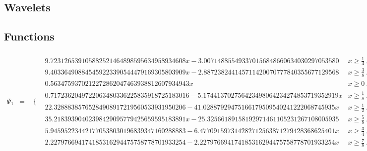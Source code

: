 \documentclass{article}
\begin{document}
 \begin{landscape}
\section{Wavelets}
\subsection{Functions}
 \begin{eqnarray*}
\Psi_1 & = & \begin{array}{cc}
 \{ & 
\begin{array}{cc}
 9.723126539105882521464898595634958934608 x-3.007148855493370156848660634030297053580 & x\geq \frac{1}{4}\land x<\frac{3}{8} \\
 9.403364908845459223390544479169305803909 x-2.887238244145711420070777840355677129568 & x\geq \frac{3}{8}\land x<\frac{1}{2} \\
 0.5634759370212272862047463938812607934943 x & x\geq 0\land x<\frac{1}{8} \\
 0.7172362049722063480336225835918725183016-5.174413702756423498064234274853719352919 x & x\geq \frac{1}{8}\land x<\frac{1}{4} \\
 22.32888385765284908917219560533931950206-41.02887929475166179509540241222068745935 x & x\geq \frac{1}{2}\land x<\frac{5}{8} \\
 35.21839390402398429095779425659595183891 x-25.32566189158192971461105231267108005935 & x\geq \frac{5}{8}\land x<\frac{3}{4} \\
 5.945952234421770538030196839347160288883-6.477091597314282712563871279428368625401 x & x\geq \frac{3}{4}\land x<\frac{7}{8} \\
 2.227976694174185316294475758778701933254-2.227976694174185316294475758778701933254 x & x\geq \frac{7}{8}\land x<1
\end{array}


\end{array}
\end{eqnarray*}
\end{landscape}
\end{document}
